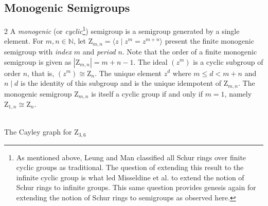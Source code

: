 \documentclass{article}
\theoremstyle{plain}
\theoremstyle{definition}
\newcommand{\N}{\mathbb{N}}
\newcommand{\z}{\mathrm{Z}}
\begin{document}
\subsection{Monogenic Semigroups}
\begin{multicols}{2}
A \emph{monogenic} (or \emph{cyclic}\footnote{As mentioned above, Leung and Man classified all Schur rings over finite cyclic groups as traditional. The question of extending this result to the infinite cyclic group is what led Misseldine et al. \cite{InfiniteI} to extend the notion of Schur rings to infinite groups. This same question provides genesis again for extending the notion of Schur rings to semigroups as observed here.}) semigroup is a semigroup generated by a single element. For $m,n\in \N$, let \label{zmn}$\z_{m,n} = \langle z\mid z^m=z^{m+n}\rangle$ present the finite monogenic semigroup with \emph{index} $m$ and \emph{period} $n$. Note that the order of a finite monogenic semigroup is given as $|\z_{m,n}| = m+n-1$. The ideal $( z^m)$ is a cyclic subgroup of order $n$, that is, $(z^m) \cong \z_n$. The unique element $z^d$ where $m\le d < m+n$ and $n\mid d$ is the identity of this subgroup and is the unique idempotent of $\z_{m,n}$. The monogenic semigroup \label{monoG}$\z_{m,n}$ is itself a cyclic group if and only if $m=1$, namely $\z_{1,n} \cong \z_n$. \columnbreak

\begin{center}
\\
The Cayley graph for $\z_{3,6}$
\end{center}
\end{multicols}
\end{document}

